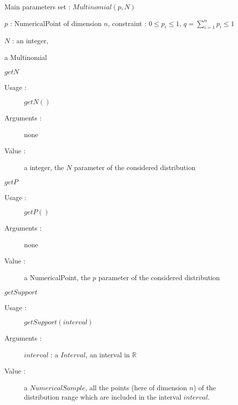\begin{description}

\item[Usage :] Main parameters set : $Multinomial(p, N)$

\item[Arguments :]  \rule{0pt}{1em}
  \begin{description}
  \item $p$ :  NumericalPoint of dimension $n$,
    constraint : $0\leq p_i \leq 1$, $\displaystyle q = \sum_{i=1}^n p_i \leq 1$
  \item $N$ :  an integer,
  \end{description}

\item[Value :] a Multinomial

\item[Some methods :] \rule{0pt}{1em}
  \begin{description}

  \item $getN$
    \begin{description}
    \item[Usage :] $getN()$
    \item[Arguments :] none
    \item[Value :]  a integer, the  $N$ parameter of the considered distribution
    \end{description}
    \bigskip

  \item $getP$
    \begin{description}
    \item[Usage :] $getP()$
    \item[Arguments :] none
    \item[Value :]  a NumericalPoint, the  $p$ parameter of the considered distribution
    \end{description}
    \bigskip

  \item $getSupport$
    \begin{description}
    \item[Usage :] $getSupport(interval)$
    \item[Arguments :] $interval$ : a $Interval$, an interval in $\mathbb{R}$
    \item[Value :]  a $NumericalSample$, all the points (here of dimension $n$) of the distribution range which are included in the interval $interval$.
    \end{description}
  \end{description}


\end{description}
